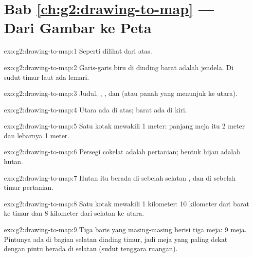 \section*{Bab \ref{ch:g2:drawing-to-map} --- Dari Gambar ke Peta}

\begin{solution}{exo:g2:drawing-to-map:1}
Seperti dilihat dari atas.
\end{solution}

\begin{solution}{exo:g2:drawing-to-map:2}
Garis-garis biru di dinding barat adalah jendela. Di sudut timur laut ada
lemari.
\end{solution}

\begin{solution}{exo:g2:drawing-to-map:3}
Judul, , , dan  (atau panah yang menunjuk ke utara).
\end{solution}

\begin{solution}{exo:g2:drawing-to-map:4}
Utara ada di atas; barat ada di kiri.
\end{solution}

\begin{solution}{exo:g2:drawing-to-map:5}
Satu kotak mewakili 1 meter: panjang meja itu 2 meter dan lebarnya 1 meter.
\end{solution}

\begin{solution}{exo:g2:drawing-to-map:6}
Persegi cokelat adalah pertanian; bentuk hijau adalah hutan.
\end{solution}

\begin{solution}{exo:g2:drawing-to-map:7}
Hutan itu berada di sebelah selatan , dan di sebelah timur pertanian.
\end{solution}

\begin{solution}{exo:g2:drawing-to-map:8}
Satu kotak mewakili 1 kilometer: 10 kilometer dari barat ke timur dan 8
kilometer dari selatan ke utara.
\end{solution}

\begin{solution}{exo:g2:drawing-to-map:9}
Tiga baris yang masing-masing berisi tiga meja: 9 meja. Pintunya ada di
bagian selatan dinding timur, jadi meja yang paling dekat dengan pintu
berada di selatan (sudut tenggara ruangan).
\end{solution}

